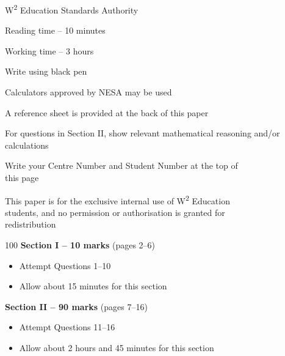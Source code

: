 \begin{coverpage}
	{\fontsize{13pt}{13pt}\selectfont W\textsuperscript{2} Education Standards Authority}
	\vspace{2.4cm}



	\vspace{1cm}

		\begin{generalinstructions}
			\item Reading time -- 10 minutes
			\item Working time -- 3 hours
			\item Write using black pen
			\item Calculators approved by NESA may be used
			\item A reference sheet is provided at the back of this paper
			\item For questions in Section II, show relevant mathematical reasoning and/or calculations
			\item Write your Centre Number and Student Number at the top of \\ this page
      \item This paper is for the exclusive internal use of W\textsuperscript{2} Education\\ students, and no permission or authorisation is granted for\\ redistribution
		\end{generalinstructions}

	\vspace{1cm}

	\begin{sectionlist}{100}
		\textbf{Section I -- 10 marks} (pages 2--6)
		\begin{itemize}
			\item Attempt Questions 1--10
			\item Allow about 15 minutes for this section
		\end{itemize}
		\textbf{Section II -- 90 marks} (pages 7--16)
		\begin{itemize}
			\item Attempt Questions 11--16
			\item Allow about 2 hours and 45 minutes for this section
		\end{itemize}
	\end{sectionlist}
\end{coverpage}
